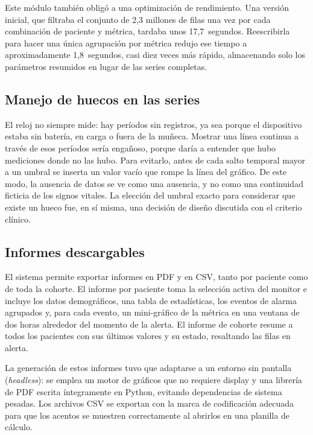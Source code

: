 \documentclass[12pt,a4paper]{article}
\begin{document}
    Este módulo también obligó a una optimización de rendimiento. Una versión inicial, que filtraba el conjunto de 2,3 millones de filas una vez por cada combinación de paciente y métrica, tardaba unos 17,7~segundos. Reescribirla para hacer una única agrupación por métrica redujo ese tiempo a aproximadamente 1,8~segundos, casi diez veces más rápido, almacenando solo los parámetros resumidos en lugar de las series completas.


    \subsection{Manejo de huecos en las series}
    El reloj no siempre mide: hay períodos sin registros, ya sea porque el dispositivo estaba sin batería, en carga o fuera de la muñeca. Mostrar una línea continua a través de esos períodos sería engañoso, porque daría a entender que hubo mediciones donde no las hubo. Para evitarlo, antes de cada salto temporal mayor a un umbral se inserta un valor vacío que rompe la línea del gráfico. De este modo, la ausencia de datos se ve como una ausencia, y no como una continuidad ficticia de los signos vitales. La elección del umbral exacto para considerar que existe un hueco fue, en sí misma, una decisión de diseño discutida con el criterio clínico.

    \subsection{Informes descargables}
    El sistema permite exportar informes en PDF y en CSV, tanto por paciente como de toda la cohorte. El informe por paciente toma la selección activa del monitor e incluye los datos demográficos, una tabla de estadísticas, los eventos de alarma agrupados y, para cada evento, un mini-gráfico de la métrica en una ventana de dos horas alrededor del momento de la alerta. El informe de cohorte resume a todos los pacientes con sus últimos valores y su estado, resaltando las filas en alerta.

    La generación de estos informes tuvo que adaptarse a un entorno sin pantalla (\textit{headless}): se emplea un motor de gráficos que no requiere display y una librería de PDF escrita íntegramente en Python, evitando dependencias de sistema pesadas. Los archivos CSV se exportan con la marca de codificación adecuada para que los acentos se muestren correctamente al abrirlos en una planilla de cálculo.
\end{document}
